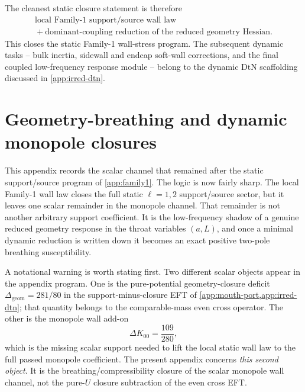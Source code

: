 \documentclass[11pt]{article}
\newcommand{\DtN}{\mathrm{DtN}}
\begin{document}
The cleanest static closure statement is therefore
\begin{equation}
\boxed{
\begin{gathered}
\text{local Family-1 support/source wall law}\\
{}+\text{dominant-coupling reduction of the reduced geometry Hessian}.
\end{gathered}
}
\label{eq:family1-final-static-closure}
\end{equation}
This closes the static Family-1 wall-stress program.  The subsequent dynamic tasks -- bulk
inertia, sidewall and endcap soft-wall corrections, and the final coupled low-frequency
response module -- belong to the dynamic \(\DtN\) scaffolding discussed in
\cref{app:irred-dtn}.

\section{Geometry-breathing and dynamic monopole closures}
\label{app:geom-breathing}

This appendix records the scalar channel that remained after the static support/source
program of \cref{app:family1}.  The logic is now fairly sharp.
The local Family-1 wall law closes the full static \(\ell=1,2\) support/source sector,
but it leaves one scalar remainder in the monopole channel.
That remainder is not another arbitrary support coefficient.
It is the low-frequency shadow of a genuine reduced geometry response in the throat
variables \((a,L)\), and once a minimal dynamic reduction is written down it becomes an
exact positive two-pole breathing susceptibility.

A notational warning is worth stating first.
Two different scalar objects appear in the appendix program.
One is the pure-potential geometry-closure deficit
\(\Delta_{\mathrm{geom}}=281/80\) in the support-minus-closure EFT of
\cref{app:mouth-port,app:irred-dtn}; that quantity belongs to the
comparable-mass even cross operator.
The other is the monopole wall add-on
\begin{equation}
\Delta K_{00}=\frac{109}{280},
\label{eq:geom-breathing-deltaK00}
\end{equation}
which is the missing scalar support needed to lift the local static wall law to the full
passed monopole coefficient.
The present appendix concerns \emph{this second object}.
It is the breathing/compressibility closure of the scalar monopole wall channel,
not the pure-\(U\) closure subtraction of the even cross EFT.
\end{document}
